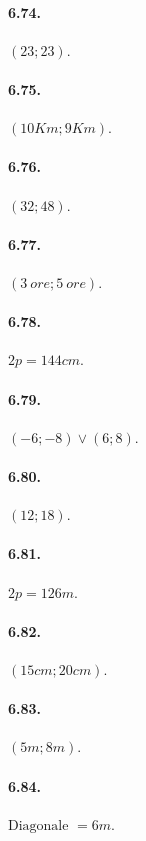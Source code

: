 \begin{multicols}{2}
\paragraph{6.74.} $(23;23)$.

\paragraph{6.75.} $(10 \unit{Km};9 \unit{Km})$.

\paragraph{6.76.} $(32;48)$.

\paragraph{6.77.} $(3~\unit{ore};5~\unit{ore})$.

\paragraph{6.78.} $2p=144\unit{cm}$.

\paragraph{6.79.} $(-6;-8)\vee (6;8)$.

\paragraph{6.80.} $(12;18)$.

\paragraph{6.81.} $2p=126\unit{m}$.

\paragraph{6.82.} $(15\unit{cm};20\unit{cm})$.

\paragraph{6.83.} $(5\unit{m};8\unit{m})$.

\paragraph{6.84.} $\text{Diagonale }=6\unit{m}$.


\end{multicols}
